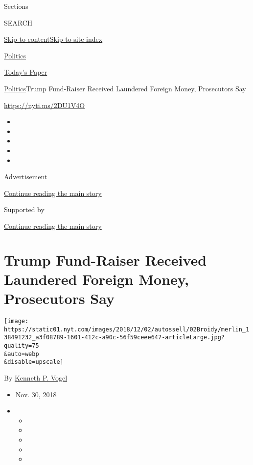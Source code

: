 Sections

SEARCH

\protect\hyperlink{site-content}{Skip to
content}\protect\hyperlink{site-index}{Skip to site index}

\href{https://www.nytimes.com/section/politics}{Politics}

\href{https://myaccount.nytimes.com/auth/login?response_type=cookie\&client_id=vi}{}

\href{https://www.nytimes.com/section/todayspaper}{Today's Paper}

\href{/section/politics}{Politics}\textbar{}Trump Fund-Raiser Received
Laundered Foreign Money, Prosecutors Say

\url{https://nyti.ms/2DU1V4O}

\begin{itemize}
\item
\item
\item
\item
\item
\end{itemize}

Advertisement

\protect\hyperlink{after-top}{Continue reading the main story}

Supported by

\protect\hyperlink{after-sponsor}{Continue reading the main story}

\hypertarget{trump-fund-raiser-received-laundered-foreign-money-prosecutors-say}{%
\section{Trump Fund-Raiser Received Laundered Foreign Money, Prosecutors
Say}\label{trump-fund-raiser-received-laundered-foreign-money-prosecutors-say}}

\texttt{[image: https://static01.nyt.com/images/2018/12/02/autossell/02Broidy/merlin\_138491232\_a3f08789-1601-412c-a90c-56f59ceee647-articleLarge.jpg?quality=75\\\&auto=webp\\\&disable=upscale]}

By \href{https://www.nytimes.com/by/kenneth-p-vogel}{Kenneth P. Vogel}

\begin{itemize}
\item
  Nov. 30, 2018
\item
  \begin{itemize}
  \item
  \item
  \item
  \item
  \item
  \end{itemize}
\end{itemize}

